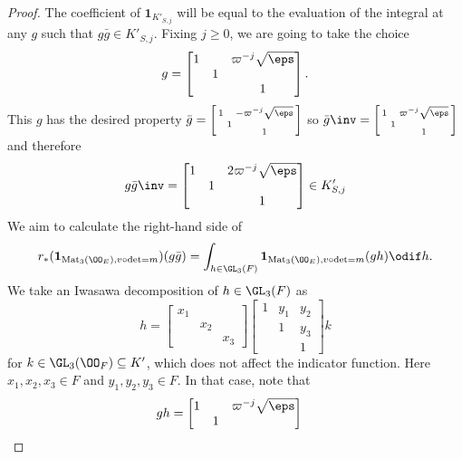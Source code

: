 \begin{proof}
  The coefficient of $\mathbf{1}_{K'_{S,j}}$ will be equal to
  the evaluation of the integral at any $g$ such that $g\bar{g} \in K'_{S,j}$.
  Fixing $j \ge 0$, we are going to take the choice
  \[
    g = \begin{bmatrix}
      1 &   & \varpi^{-j} \sqrt{\eps} \\
      & 1 \\
      &   & 1
    \end{bmatrix}.
  \]
  This $g$ has the desired property
  $\bar{g} = \left[ \begin{smallmatrix} 1 &   & -\varpi^{-j} \sqrt{\eps} \\ & 1 \\ &   & 1 \end{smallmatrix} \right]$
  so
  $\bar{g}\inv = \left[ \begin{smallmatrix} 1 &   & \varpi^{-j} \sqrt{\eps} \\ & 1 \\ &   & 1 \end{smallmatrix} \right]$
  and therefore
  \[
    g\bar{g}\inv = \begin{bmatrix}
      1 &   & 2\varpi^{-j} \sqrt{\eps} \\
      & 1 \\
      &   & 1
    \end{bmatrix} \in K'_{S,j}
  \]
  We aim to calculate the right-hand side of
  \[
    r_\ast(\mathbf{1}_{\Mat_3(\OO_E), v\circ\det=m})(g\bar{g})
    = \int_{h \in \GL_3(F)} \mathbf{1}_{\Mat_3(\OO_E), v\circ\det=m}(gh) \odif h.
  \]
  We take an Iwasawa decomposition of $h \in \GL_3(F)$ as
  \[
    h =
    \begin{bmatrix} x_1 \\ & x_2 \\ && x_3 \end{bmatrix}
    \begin{bmatrix} 1 & y_1 & y_2 \\ & 1 & y_3 \\ & & 1 \end{bmatrix}
    k
  \]
  for $k \in \GL_3(\OO_F) \subseteq K'$, which does not affect the indicator function.
  Here $x_1, x_2, x_3 \in F$ and $y_1, y_2, y_3 \in F$.
  In that case, note that
  \begin{align*}
    gh
    &=
    \begin{bmatrix}
      1 &   & \varpi^{-j}\sqrt\eps \\
      & 1 \\

\end{bmatrix}
\end{align*}
\end{proof}
